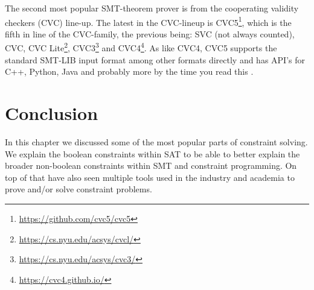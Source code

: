 The second most popular SMT-theorem prover is from the cooperating validity checkers (CVC) line-up. The latest in the CVC-lineup is CVC5\footnote{\url{https://github.com/cvc5/cvc5}}, which is the fifth in line of the CVC-family, the previous being: SVC (not always counted), CVC, 
CVC Lite\footnote{\url{https://cs.nyu.edu/acsys/cvcl/}}, 
CVC3\footnote{\url{https://cs.nyu.edu/acsys/cvc3/}}\cite{71barrett2007cvc3} and 
CVC4\footnote{\url{https://cvc4.github.io/}}.
As like CVC4, CVC5 supports the standard SMT-LIB input format among other formats directly and has API's for C++, Python, Java and probably more by the time you read this \cite{62barrettcvc5, 63barbosa2022cvc5}.

\section{Conclusion}
\label{CS:conclusion}
In this chapter we discussed some of the most popular parts of constraint solving. We explain the boolean constraints within SAT to be able to better explain the broader non-boolean constraints within SMT and constraint programming. On top of that have also seen multiple tools used in the industry and academia to prove and/or solve constraint problems.

